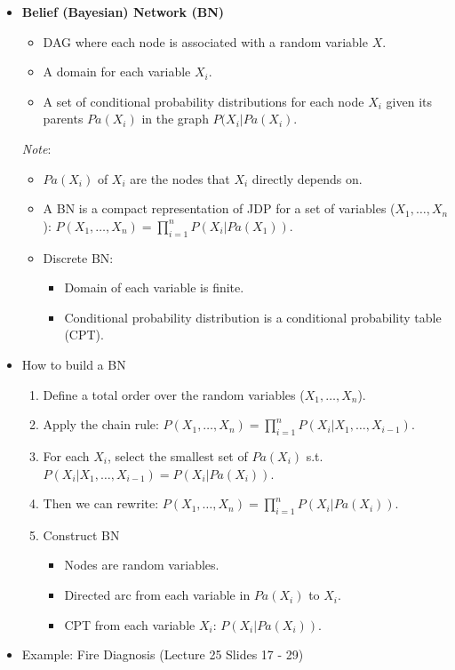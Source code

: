 \documentclass{article}
\begin{document}
\begin{itemize}
    \item \textbf{Belief (Bayesian) Network (BN)}
        \begin{itemize}
            \item DAG where each node is associated with a random variable $X$.
            \item A domain for each variable $X_i$.
            \item A set of conditional probability distributions for each node $X_i$ given its parents $Pa(X_i)$ in the graph $P(X_i|Pa(X_i)$.
        \end{itemize}
    \textit{Note}:
        \begin{itemize}
            \item $Pa(X_i)$ of $X_i$ are the nodes that $X_i$ directly depends on.
            \item A BN is a compact representation of JDP for a set of variables ($X_1, \ldots, X_n$): $P(X_1, \ldots, X_n) = \prod\limits_{i=1}^{n} P(X_i|Pa(X_1))$.
            \item Discrete BN:
                \begin{itemize}
                    \item Domain of each variable is finite.
                    \item Conditional probability distribution is a conditional probability table (CPT).
                \end{itemize}
        \end{itemize}
    \item How to build a BN
        \begin{enumerate}
            \item Define a total order over the random variables ($X_1, \ldots, X_n$).
            \item Apply the chain rule: $P(X_1, \ldots, X_n) = \prod\limits_{i=1}^{n} P(X_i|X_1, \ldots, X_{i-1})$.
            \item For each $X_i$, select the smallest set of $Pa(X_i)$ s.t. $P(X_i|X_1, \ldots, X_{i-1}) = P(X_i|Pa(X_i))$.
            \item Then we can rewrite: $P(X_1, \ldots, X_n) = \prod_{i=1}^{n} P(X_i|Pa(X_i))$.
            \item Construct BN
                \begin{itemize}
                    \item Nodes are random variables.
                    \item Directed arc from each variable in $Pa(X_i)$ to $X_i$.
                    \item CPT from each variable $X_i$: $P(X_i|Pa(X_i))$.
                \end{itemize}
        \end{enumerate}
    \item Example: Fire Diagnosis (Lecture 25 Slides 17 - 29)
\end{itemize}
\end{document}
